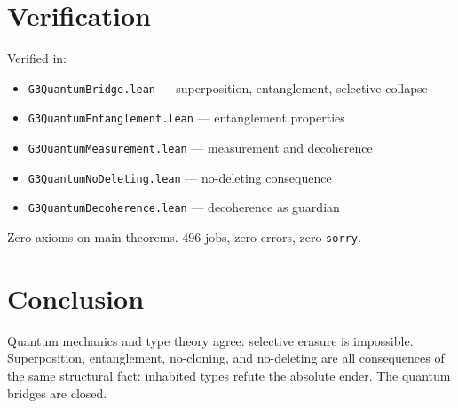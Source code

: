 \documentclass[12pt,a4paper]{article}
\begin{document}
\section{Verification}

Verified in:
\begin{itemize}
    \item \texttt{G3QuantumBridge.lean} --- superposition, entanglement, selective collapse
    \item \texttt{G3QuantumEntanglement.lean} --- entanglement properties
    \item \texttt{G3QuantumMeasurement.lean} --- measurement and decoherence
    \item \texttt{G3QuantumNoDeleting.lean} --- no-deleting consequence
    \item \texttt{G3QuantumDecoherence.lean} --- decoherence as guardian
\end{itemize}

Zero axioms on main theorems. 496 jobs, zero errors, zero \texttt{sorry}.

\section{Conclusion}

Quantum mechanics and type theory agree: selective erasure is impossible.
Superposition, entanglement, no-cloning, and no-deleting are all
consequences of the same structural fact: inhabited types refute the
absolute ender. The quantum bridges are closed.
\end{document}
